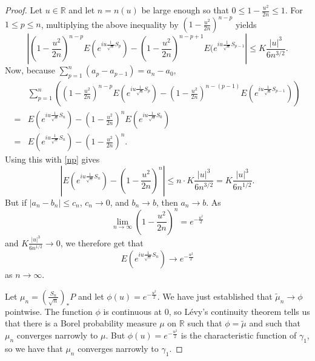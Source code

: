 \documentclass{article}
\theoremstyle{definition}
\begin{document}
\begin{proof}
Let $u \in \mathbb{R}$ and let $n=n(u)$ be large enough so that
$0 \leq 1-\frac{u^2}{2n} \leq 1$. For $1 \leq p \leq n$, multiplying the above inequality by $\left(1-\frac{u^2}{2n}\right)^{n-p}$
yields
\begin{equation}
\left| \left(1-\frac{u^2}{2n} \right)^{n-p} E(e^{iu\frac{1}{\sqrt{n}}S_p})
-\left(1-\frac{u^2}{2n}\right)^{n-p+1} E(e^{iu\frac{1}{\sqrt{n}}S_{p-1}}\right|
\leq K \frac{|u|^3}{6n^{3/2}}.
\label{np}
\end{equation}
Now, because $\sum_{p=1}^n (a_p-a_{p-1})=a_n-a_0$,
\[
\begin{split}
&\sum_{p=1}^n \left( \left(1-\frac{u^2}{2n} \right)^{n-p} E(e^{iu\frac{1}{\sqrt{n}}S_p})
-\left(1-\frac{u^2}{2n}\right)^{n-(p-1)}
E(e^{iu\frac{1}{\sqrt{n}}S_{p-1}})\right)\\
=&E(e^{iu\frac{1}{\sqrt{n}}S_n})-\left(1-\frac{u^2}{2n}\right)^n E(e^{iu\frac{1}{\sqrt{n}}S_0})\\
=&E(e^{iu\frac{1}{\sqrt{n}}S_n}) - \left(1-\frac{u^2}{2n}\right)^n.
\end{split}
\]
Using this with \eqref{np} gives
\[
\left| E(e^{iu\frac{1}{\sqrt{n}}S_n}) - \left(1-\frac{u^2}{2n}\right)^n \right| \leq n\cdot K\frac{|u|^3}{6n^{3/2}}
=K\frac{|u|^3}{6n^{1/2}}. 
\]
But if $|a_n-b_n| \leq c_n$, $c_n \to 0$, and $b_n \to b$, then $a_n \to b$. As
\[
\lim_{n \to \infty} \left(1-\frac{u^2}{2n}\right)^n = e^{-\frac{u^2}{2}}
\]
and $K\frac{|u|^3}{6n^{1/2}} \to 0$, we therefore get that
\[
E(e^{iu\frac{1}{\sqrt{n}}S_n}) \to e^{-\frac{u^2}{2}}
\]
 as $n \to \infty$. 

Let $\mu_n=\left(\frac{S_n}{\sqrt{n}}\right)_*P$ and let $\phi(u)=e^{-\frac{u^2}{2}}$. We have just established that
$\tilde{\mu}_n \to \phi$ pointwise. The function $\phi$ is continuous at $0$, so 
L\'evy's continuity theorem tells us that there is a Borel probability measure $\mu$ on
$\mathbb{R}$ such that $\phi = \tilde{\mu}$ and such that $\mu_n$ converges narrowly to $\mu$. 
But $\phi(u)=e^{-\frac{u^2}{2}}$ is the characteristic function of $\gamma_1$, so we have that
$\mu_n$ converges narrowly to $\gamma_1$. 


\end{proof}
\end{document}

